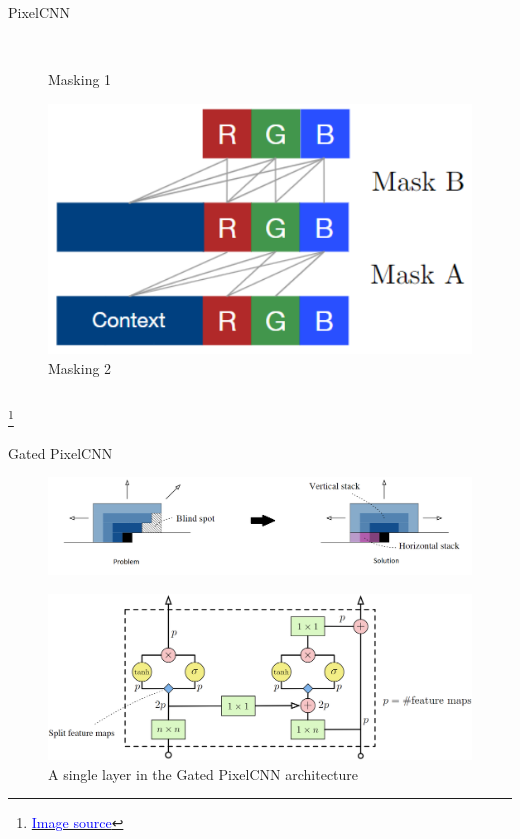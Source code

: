 \documentclass[t]{beamer}  %
\newcommand\blfootnote[1]{%
  \begingroup
  \renewcommand\thefootnote{}\footnote{#1}%
  \addtocounter{footnote}{-1}%
  \endgroup
}
\begin{document}
\begin{frame}[t]{PixelCNN \cite{pixel}}
\begin{columns}[t]
\begin{column}{.35\textwidth}
\begin{figure}[c]
            \\ \scriptsize Masking 1
        \end{figure}
        \begin{figure}[hp]
            \centering
            \includegraphics[scale=0.44]{mask2_22.png}
            \\ \scriptsize Masking 2
        \end{figure}
\end{column}
\end{columns}
\scriptsize\blfootnote{\href{https://towardsdatascience.com/autoregressive-models-pixelcnn-e30734ede0c1}{\scriptsize{\textcolor{blue}{Image source}}}}
\end{frame}

\begin{frame}{Gated PixelCNN \cite{conpixel}}
\begin{figure}[hp]
    \centering
    \includegraphics[width=\textwidth]{images/blind.png}
\end{figure}
\pause
\centering
\begin{figure}[hp]
    \centering
    \includegraphics[scale=0.5]{images/gated.png}
    \\ \footnotesize A single layer in the Gated PixelCNN architecture
\end{figure}
\end{frame}
\end{document}
